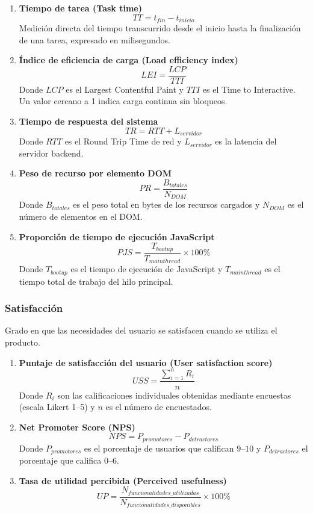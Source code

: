 \begin{enumerate}
    \item \textbf{Tiempo de tarea (Task time)}
          \[
              TT = t_{fin} - t_{inicio}
          \]
          Medición directa del tiempo transcurrido desde el inicio hasta la finalización de una tarea, expresado en milisegundos.

    \item \textbf{Índice de eficiencia de carga (Load efficiency index)}
          \[
              LEI = \frac{LCP}{TTI}
          \]
          Donde \(LCP\) es el Largest Contentful Paint y \(TTI\) es el Time to Interactive. Un valor cercano a 1 indica carga continua sin bloqueos.

    \item \textbf{Tiempo de respuesta del sistema}
          \[
              TR = RTT + L_{servidor}
          \]
          Donde \(RTT\) es el Round Trip Time de red y \(L_{servidor}\) es la latencia del servidor backend.

    \item \textbf{Peso de recurso por elemento DOM}
          \[
              PR = \frac{B_{totales}}{N_{DOM}}
          \]
          Donde \(B_{totales}\) es el peso total en bytes de los recursos cargados y \(N_{DOM}\) es el número de elementos en el DOM.

    \item \textbf{Proporción de tiempo de ejecución JavaScript}
          \[
              PJS = \frac{T_{bootup}}{T_{mainthread}} \times 100\%
          \]
          Donde \(T_{bootup}\) es el tiempo de ejecución de JavaScript y \(T_{mainthread}\) es el tiempo total de trabajo del hilo principal.
\end{enumerate}

\subsubsection{Satisfacción}

Grado en que las necesidades del usuario se satisfacen cuando se utiliza el producto.

\begin{enumerate}
    \item \textbf{Puntaje de satisfacción del usuario (User satisfaction score)}
          \[
              USS = \frac{\sum_{i=1}^{n} R_i}{n}
          \]
          Donde \(R_i\) son las calificaciones individuales obtenidas mediante encuestas (escala Likert 1--5) y \(n\) es el número de encuestados.

    \item \textbf{Net Promoter Score (NPS)}
          \[
              NPS = P_{promotores} - P_{detractores}
          \]
          Donde \(P_{promotores}\) es el porcentaje de usuarios que califican \(9\)--\(10\) y \(P_{detractores}\) el porcentaje que califica \(0\)--\(6\).

    \item \textbf{Tasa de utilidad percibida (Perceived usefulness)}
          \[
              UP = \frac{N_{funcionalidades\_utilizadas}}{N_{funcionalidades\_disponibles}} \times 100\%
          \]
\end{enumerate}


